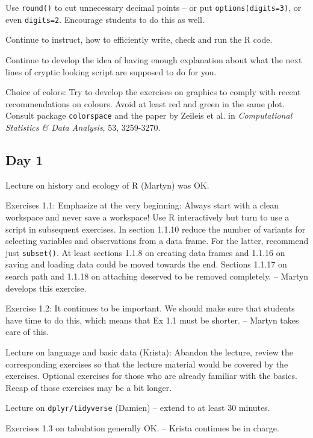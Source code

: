 Use {\tt round()} to cut unnecessary decimal points -- 
or put {\tt options(digits=3)}, or even {\tt digits=2}. Encourage students to do this as well.

Continue to instruct, how to efficiently write, check and run the R code. 

Continue to develop the idea of having enough explanation about what the 
next lines of cryptic looking script are supposed to do for you.

Choice of colors: Try to develop the exercises on graphics to comply with
recent recommendations on colours. 
Avoid at least red and green in the same plot. 
Consult package {\tt colorspace}
and the paper by Zeileis et al. in
 {\it Computational Statistics \& Data Analysis}, 53, 3259-3270.


\subsection*{Day 1}

Lecture on history and ecology of R (Martyn) was OK. 

Exercises 1.1: Emphasize at the very beginning: Always start with a clean workspace and never save a workspace!
Use R interactively but turn to use a script in subsequent exercises.
In section 1.1.10 reduce the number of variants for selecting variables and observations from a data frame. For the latter, recommend just 
{\tt subset()}.
 At least sections 1.1.8 on creating data frames and 1.1.16 on saving and loading data could be
moved towards the end. Sections 1.1.17 on search path and 1.1.18 on attaching deserved to be removed completely.
-- Martyn develops this exercise. 

Exercise 1.2: It continues to be important. We should make sure that students have time to do this, which means that Ex 1.1 must be shorter.
-- Martyn takes care of this. 

Lecture on language and basic data (Krista): Abandon the lecture, review the corresponding 
exercises so that the lecture material would be covered by the exercises. 
Optional exercises for those who are already familiar with the basics. Recap of those exercises may be a bit longer.  


Lecture on {\tt dplyr/tidyverse} (Damien) -- extend to at least 30 minutes.  


Exercises 1.3 on tabulation generally OK. -- Krista continues be in charge. 

